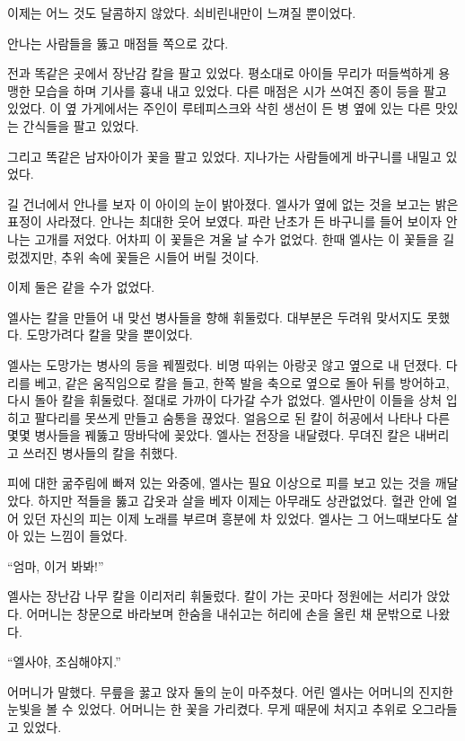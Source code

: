 이제는 어느 것도 달콤하지 않았다. 쇠비린내만이 느껴질 뿐이었다.

\textbreak

안나는 사람들을 뚫고 매점들 쪽으로 갔다.

전과 똑같은 곳에서 장난감 칼을 팔고 있었다. 평소대로 아이들 무리가 떠들썩하게 용맹한 모습을 하며 기사를 흉내 내고 있었다. 다른 매점은 시가 쓰여진 종이 등을 팔고 있었다. 이 옆 가게에서는 주인이 루테피스크와 삭힌 생선이 든 병 옆에 있는 다른 맛있는 간식들을 팔고 있었다.

그리고 똑같은 남자아이가 꽃을 팔고 있었다. 지나가는 사람들에게 바구니를 내밀고 있었다.

길 건너에서 안나를 보자 이 아이의 눈이 밝아졌다. 엘사가 옆에 없는 것을 보고는 밝은 표정이 사라졌다. 안나는 최대한 웃어 보였다. 파란 난초가 든 바구니를 들어 보이자 안나는 고개를 저었다. 어차피 이 꽃들은 겨울 날 수가 없었다. 한때 엘사는 이 꽃들을 길렀겠지만, 추위 속에 꽃들은 시들어 버릴 것이다.

이제 둘은 같을 수가 없었다.

\textbreak

엘사는 칼을 만들어 내 맞선 병사들을 향해 휘둘렀다. 대부분은 두려워 맞서지도 못했다. 도망가려다 칼을 맞을 뿐이었다.

엘사는 도망가는 병사의 등을 꿰찔렀다. 비명 따위는 아랑곳 않고 옆으로 내 던졌다. 다리를 베고, 같은 움직임으로 칼을 들고, 한쪽 발을 축으로 옆으로 돌아 뒤를 방어하고, 다시 돌아 칼을 휘둘렀다. 절대로 가까이 다가갈 수가 없었다. 엘사만이 이들을 상처 입히고 팔다리를 못쓰게 만들고 숨통을 끊었다. 얼음으로 된 칼이 허공에서 나타나 다른 몇몇 병사들을 꿰뚫고 땅바닥에 꽂았다. 엘사는 전장을 내달렸다. 무뎌진 칼은 내버리고 쓰러진 병사들의 칼을 취했다.

피에 대한 굶주림에 빠져 있는 와중에, 엘사는 필요 이상으로 피를 보고 있는 것을 깨달았다. 하지만 적들을 뚫고 갑옷과 살을 베자 이제는 아무래도 상관없었다. 혈관 안에 얼어 있던 자신의 피는 이제 노래를 부르며 흥분에 차 있었다. 엘사는 그 어느때보다도 살아 있는 느낌이 들었다.

``엄마, 이거 봐봐!''

엘사는 장난감 나무 칼을 이리저리 휘둘렀다. 칼이 가는 곳마다 정원에는 서리가 앉았다. 어머니는 창문으로 바라보며 한숨을 내쉬고는 허리에 손을 올린 채 문밖으로 나왔다.

``엘사야, 조심해야지.''

어머니가 말했다. 무릎을 꿇고 앉자 둘의 눈이 마주쳤다. 어린 엘사는 어머니의 진지한 눈빛을 볼 수 있었다. 어머니는 한 꽃을 가리켰다. 무게 때문에 처지고 추위로 오그라들고 있었다.

